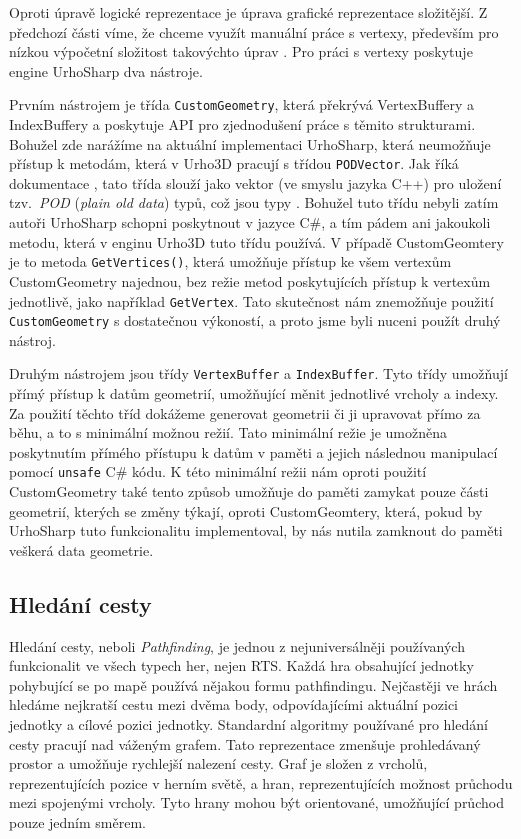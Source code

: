 Oproti úpravě logické reprezentace je úprava grafické reprezentace složitější. Z předchozí části víme, že chceme využít manuální práce s vertexy, především pro nízkou výpočetní složitost takovýchto úprav . Pro práci s vertexy poskytuje engine UrhoSharp dva nástroje. 

Prvním nástrojem je třída \texttt{CustomGeometry}, která překrývá VertexBuffery a IndexBuffery a poskytuje API pro zjednodušení práce s těmito strukturami. Bohužel zde narážíme na aktuální implementaci UrhoSharp, která neumožňuje přístup k metodám, která v Urho3D pracují s třídou \texttt{PODVector}. Jak říká dokumentace \citep{site:urho3DPOD}, tato třída slouží jako vektor (ve smyslu jazyka C++) pro uložení tzv.~\textit{POD} (\textit{plain old data}) typů, což jsou typy \textit{} . Bohužel tuto třídu nebyli zatím autoři UrhoSharp schopni poskytnout v jazyce C\#, a tím pádem ani jakoukoli metodu, která v enginu Urho3D tuto třídu používá. V případě CustomGeomtery je to metoda \texttt{GetVertices()}, která umožňuje přístup ke všem vertexům CustomGeometry najednou, bez režie metod poskytujících přístup k vertexům jednotlivě, jako například \texttt{GetVertex}. Tato skutečnost nám znemožňuje použití \texttt{CustomGeometry} s dostatečnou výkoností, a proto jsme byli nuceni použít druhý nástroj.

Druhým nástrojem jsou třídy \texttt{VertexBuffer} a \texttt{IndexBuffer}. Tyto třídy umožňují přímý přístup k datům geometrií, umožňující měnit jednotlivé vrcholy a indexy. Za použití těchto tříd dokážeme generovat geometrii či ji upravovat přímo za běhu, a to s minimální možnou režií. Tato minimální režie je umožněna poskytnutím přímého přístupu k datům v paměti a jejich následnou manipulací pomocí \texttt{unsafe} C\# kódu. K této minimální režii nám oproti použití CustomGeometry také tento způsob umožňuje do paměti zamykat pouze části geometrií, kterých se změny týkají, oproti CustomGeomtery, která, pokud by UrhoSharp tuto funkcionalitu implementoval, by nás nutila zamknout do paměti veškerá data geometrie.


\subsection{Hledání cesty}
\label{sec:pathfinding}
Hledání cesty, neboli \textit{Pathfinding}, je jednou z nejuniversálněji používaných funkcionalit ve všech typech her, nejen RTS. Každá hra obsahující jednotky pohybující se po mapě používá nějakou formu pathfindingu. Nejčastěji ve hrách hledáme nejkratší cestu mezi dvěma body, odpovídajícími aktuální pozici jednotky a cílové pozici jednotky. Standardní algoritmy používané pro hledání cesty pracují nad váženým grafem. Tato reprezentace zmenšuje prohledávaný prostor a umožňuje rychlejší nalezení cesty. Graf je složen z vrcholů, reprezentujících pozice v herním světě, a hran, reprezentujících možnost průchodu mezi spojenými vrcholy. Tyto hrany mohou být orientované, umožňující průchod pouze jedním směrem.

